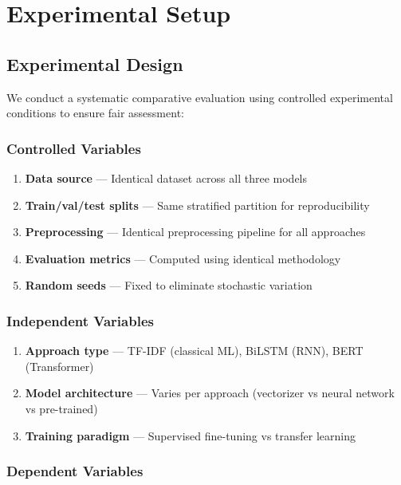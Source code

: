 \section{Experimental Setup} \label{sec:experimental}

\subsection{Experimental Design}

We conduct a systematic comparative evaluation using controlled experimental conditions to ensure fair assessment:

\subsubsection{Controlled Variables}

\begin{enumerate}
  \item \textbf{Data source} --- Identical dataset across all three models
  \item \textbf{Train/val/test splits} --- Same stratified partition for reproducibility
  \item \textbf{Preprocessing} --- Identical preprocessing pipeline for all approaches
  \item \textbf{Evaluation metrics} --- Computed using identical methodology
  \item \textbf{Random seeds} --- Fixed to eliminate stochastic variation
\end{enumerate}

\subsubsection{Independent Variables}

\begin{enumerate}
  \item \textbf{Approach type} --- TF-IDF (classical ML), BiLSTM (RNN), BERT (Transformer)
  \item \textbf{Model architecture} --- Varies per approach (vectorizer vs neural network vs pre-trained)
  \item \textbf{Training paradigm} --- Supervised fine-tuning vs transfer learning
\end{enumerate}

\subsubsection{Dependent Variables}

